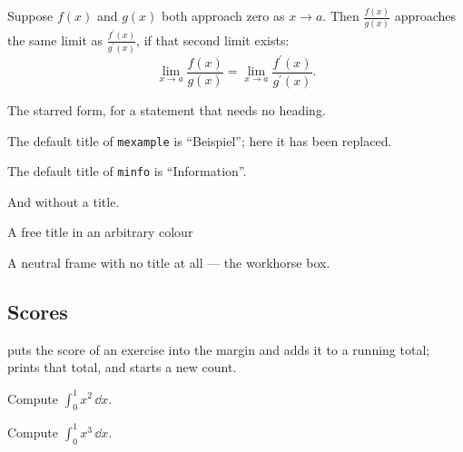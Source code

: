 \documentclass[factsheet, white, rounded, onehalfspacing, 11pt, a4paper]{msheet}
\newcommand{\commandToText}[1]{\texttt{\string#1}}
\begin{document}
\begin{mrule}
	Suppose $f(x)$ and $g(x)$ both approach zero as $x \to a$. Then
	$\frac{f(x)}{g(x)}$ approaches the same limit as
	$\frac{f^\prime(x)}{g^\prime(x)}$, if that second limit exists:
	$$\lim_{x \to a}\frac{f(x)}{g(x)} = \lim_{x \to
	a}\frac{f^\prime(x)}{g^\prime(x)}.$$
\end{mrule}

\begin{mrule*}
	The starred form, for a statement that needs no heading.
\end{mrule*}

\begin{mexperiment}
	\lipsum[1]
\end{mexperiment}

\begin{mexample}[Definition]
	The default title of \texttt{mexample} is \enquote{Beispiel}; here it has
	been replaced.
\end{mexample}

\begin{minfo}
	The default title of \texttt{minfo} is \enquote{Information}.
\end{minfo}

\begin{minfo*}
	And without a title.
\end{minfo*}

\begin{mframe}[Gold]{A free title in an arbitrary colour}
	\lipsum[2]
\end{mframe}

\begin{mframe*}
	A neutral frame with no title at all --- the workhorse box.
\end{mframe*}

\subsection{Scores}

\commandToText{\mscore} puts the score of an exercise into the margin and adds
it to a running total; \commandToText{\mtotalscore} prints that total, and
\commandToText{\mresetscore} starts a new count.

Compute $\int_0^1 x^2 \,\dd x$. 

Compute $\int_0^1 x^3 \,\dd x$. 

\mtotalscore

\mwish
\end{document}
